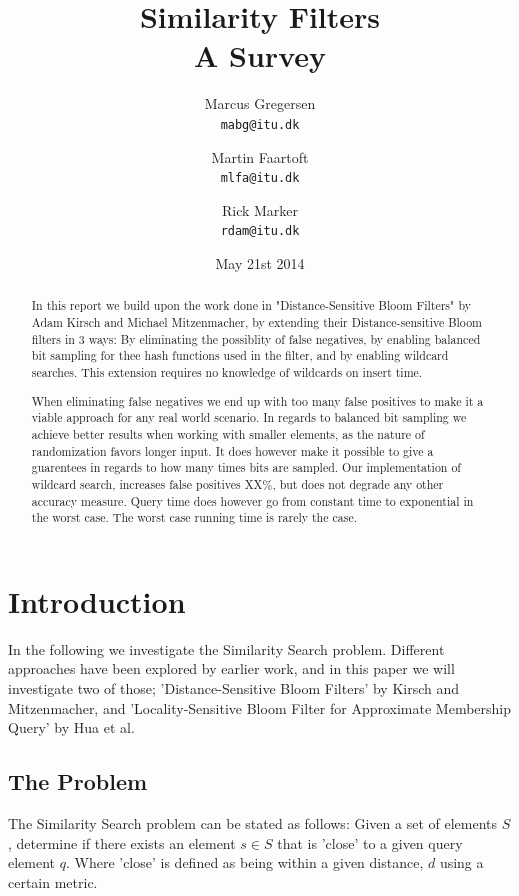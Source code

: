 \documentclass[a4paper,11pt]{article}
\begin{document}
\graphicspath{ {./images/} }
\date{May 21st 2014}
\title{Similarity Filters\\A Survey}

\author{Marcus Gregersen\\
\texttt{mabg@itu.dk}
\and Martin Faartoft\\
\texttt{mlfa@itu.dk}
\and Rick Marker\\
\texttt{rdam@itu.dk}}
\clearpage\maketitle
\thispagestyle{empty}
\setcounter{page}{1}
\begin{abstract}
In this report we build upon the work done in "Distance-Sensitive Bloom Filters" by Adam Kirsch and Michael Mitzenmacher, by extending their Distance-sensitive Bloom filters in 3 ways:
By eliminating the possiblity of false negatives, by enabling balanced bit sampling for thee hash functions used in the filter, and by enabling wildcard searches. This extension requires no knowledge of wildcards on insert time.

When eliminating false negatives we end up with too many false positives to make it a viable approach for any real world scenario.
In regards to balanced bit sampling we achieve better results when working with smaller elements, as the nature of randomization favors longer input. It does however make it possible to give a guarentees in regards to how many times bits are sampled.
Our implementation of wildcard search, increases false positives XX\%, but does not degrade any other accuracy measure. Query time does however go from constant time to exponential in the worst case. The worst case running time is rarely the case.
\end{abstract}

\newpage
\setcounter{page}{1}

\section{Introduction}
In the following we investigate the Similarity Search problem. Different approaches have been explored by earlier work, and in this paper we will investigate two of those; 'Distance-Sensitive Bloom Filters'\cite{paper:harvard} by Kirsch and Mitzenmacher, and 'Locality-Sensitive Bloom Filter for Approximate Membership Query'\cite{paper:hua} by Hua et al.

\subsection{The Problem}
The Similarity Search problem can be stated as follows: Given a set of elements $S$, determine if there exists an element $s \in S$ that is 'close' to a given query element $q$. Where 'close' is defined as being within a given distance, $d$ using a certain metric.
\end{document}
